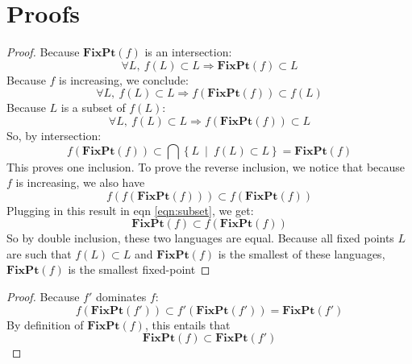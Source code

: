 \section*{Proofs} 

\begin{proof}
Because $\mathbf{FixPt}(f)$ is an intersection:
\begin{equation}
\forall L,\ f(L)\subset L \Rightarrow \mathbf{FixPt}(f) \subset L \label{eqn:subset}
\end{equation}
Because $f$ is increasing, we conclude:
$$\forall L,\ f(L)\subset L \Rightarrow f\left(\mathbf{FixPt}(f)\right) \subset f(L)$$
Because $L$ is a subset of $f(L)$:
$$\forall L,\ f(L)\subset L \Rightarrow f\left(\mathbf{FixPt}(f)\right) \subset L$$
So, by intersection:
$$f\left(\mathbf{FixPt}(f)\right) \subset \bigcap \left\lbrace L\ \middle|\ f(L)\subset L\right\rbrace = \mathbf{FixPt}(f)$$
This proves one inclusion. To prove the reverse inclusion, we notice that because $f$ is increasing, we also have
$$f(f(\mathbf{FixPt}(f)))\subset f(\mathbf{FixPt}(f))$$
Plugging in this result in eqn \ref{eqn:subset}, we get:
 $$\mathbf{FixPt}(f) \subset f(\mathbf{FixPt}(f))$$
 So by double inclusion, these two languages are equal. Because all fixed points $L$ are such that $f(L)\subset L$ and $\mathbf{FixPt}(f)$ is the smallest of these languages, $\mathbf{FixPt}(f)$ is the smallest fixed-point
\end{proof}


\begin{proof}
Because $f'$ dominates $f$:
$$f(\mathbf{FixPt}(f'))\subset f'(\mathbf{FixPt}(f')) = \mathbf{FixPt}(f')$$
By definition of $\mathbf{FixPt}(f)$, this entails that
$$\mathbf{FixPt}(f)\subset \mathbf{FixPt}(f')$$
\end{proof}






